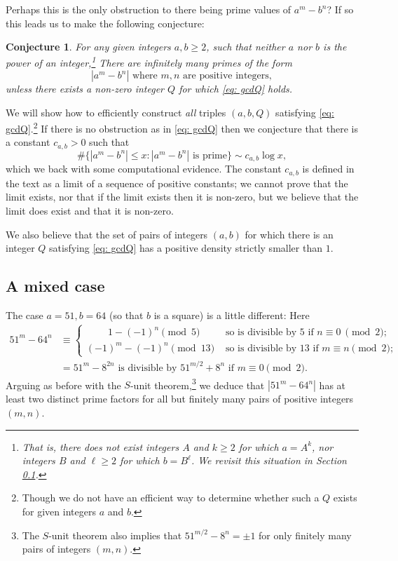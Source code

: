 \documentclass[12pt, a4paper,  reqno, english]{amsart}%
\numberwithin{equation}{section}
\newtheorem{conj}{Conjecture}
\theoremstyle{definition}
\renewcommand{\leq}{\leqslant}
\renewcommand{\geq}{\geqslant}
\begin{document}
Perhaps this is the only obstruction to there being prime values of $a^m-b^n$?
If so this leads us to make the following conjecture: 

\begin{conj}
For any given integers $a,b \geq 2$,  such that neither  $a$ nor $b$ is the power of an  integer,\footnote{ That is, there does not exist integers $A$ and $k\geq 2$ for which $a=A^k$, nor  integers $B$ and $\ell\geq 2$ for which $b=B^\ell$. We revisit this situation in Section \ref{sec: powers2}.}
 There are infinitely many primes of the form
 \[
 |a^m-b^n| \text{ where } m,n \text{ are positive integers},
 \]
 unless there exists a non-zero integer $Q$ for which \eqref{eq: gcdQ} holds.
 \end{conj}


We will show how to efficiently construct \emph{all}   triples $(a,b,Q)$ satisfying \eqref{eq: gcdQ}.\footnote{Though we do not have an efficient way to determine whether such a $Q$ exists for given integers $a$ and $b$.}
If there is no  obstruction as in \eqref{eq: gcdQ} then
 we conjecture that there is a constant $c_{a,b}>0$ such that 
 \begin{equation} \label{eq: PrimeCount}
  \#\{ |a^m-b^n|\leq x: |a^m-b^n| \text{ is prime}\} \sim  c_{a,b} \log x,
 \end{equation}
which we back with some computational evidence.  The constant $c_{a,b}$ is defined in the text as a limit of a sequence of positive constants; we cannot prove that the limit exists, nor that if the limit exists then it is non-zero, but we believe that the limit does exist and that it is non-zero.
 
 We also believe that the set of pairs of integers $(a,b)$ for which there is  an integer $Q$ satisfying \eqref{eq: gcdQ}  has a positive density strictly smaller than $1$.
 
 
 \subsection{A mixed case} \label{sec: powers2}
  The case $a=51, b=64$ (so that $b$ is a square) is a little different: Here
 \begin{align*}
 51^m-64^n&\equiv 
 \begin{cases}
  \qquad \ 1- (-1)^n \pmod 5 &\text{ so is divisible by 5 \ if }   n\equiv 0\ \pmod 2;\\
   (-1)^m-(-1)^n \pmod {13} &\text{ so is divisible by 13 if } m\equiv n\pmod 2;
 \end{cases} \\
 &=51^{m} - 8^{2n} \text{  is divisible by } 51^{m/2} + 8^n \text{ if } m\equiv 0\pmod 2.
 \end{align*}
Arguing as before with the $S$-unit theorem,\footnote{The $S$-unit theorem also implies that $51^{m/2} - 8^n=\pm 1$ for only finitely many pairs of integers $(m,n)$.}
 we deduce that $|51^m-64^n|$ has at least two distinct prime factors for all but finitely many pairs of positive integers $(m,n)$.
\end{document}
